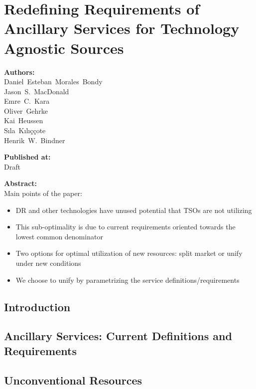 \chapter{Redefining Requirements of Ancillary Services for Technology Agnostic
Sources}\label{app:ddras}

\textbf{Authors:}\\
	Daniel~Esteban~Morales~Bondy\\
	Jason~S.~MacDonald\\
	Emre~C.~Kara\\
	Oliver~Gehrke\\
	Kai~Heussen\\
	S{\i}la~K{\i}l{\i}\c{c}\c{c}ote\\
	Henrik~W.~Bindner

\noindent
\textbf{Published at:}\\
Draft

\noindent
	\textbf{Abstract:}\\
Main points of the paper:
\begin{itemize}
\item DR and other technologies have unused potential that TSOs are not utilizing
\item This sub-optimality is due to current requirements oriented towards the lowest common denominator
\item Two options for optimal utilization of new resources: split market or unify under new conditions
\item We choose to unify by parametrizing the service definitions/requirements
\end{itemize}

\section{Introduction}


\section{Ancillary Services: Current Definitions and Requirements}
\label{sec:currentas}


\section{Unconventional Resources}
\label{sec:ancsrvDR}


